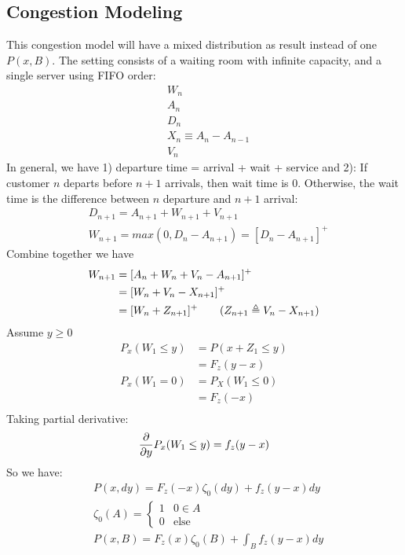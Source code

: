 \subsection{Congestion Modeling} 
This congestion model will have a mixed distribution as result instead of one $P(x,B)$. The setting consists of a waiting room with infinite capacity, and a single server using FIFO order: 
    \begin{align*}
        & W_n \tag{Waiting time for customer $n$} \\
        & A_n \tag{Arrival time for customer $n$} \\
        & D_n \tag{Departure time for customer $n$} \\
        & X_n \equiv A_n - A_{n-1} \tag{iid Inter arrival time between customer $n$ and $n-1$} \\
        & V_n \tag{iid service time for customer $n$} 
    \end{align*}
In general, we have 1) departure time = arrival + wait + service and 2): If customer $n$ departs before $n+1$ arrivals, then wait time is 0. Otherwise, the wait time is the difference between $n$ departure and $n+1$ arrival:   
    \begin{align*}
        & D_{n+1} = A_{n+1} + W_{n+1} + V_{n+1} \\
        & W_{n+1} = max(0, D_n - A_{n+1}) = [D_n - A_{n+1}]^+
    \end{align*}
Combine together we have 
    \begin{align*}
        W_{n+1} 
        & = [A_n + W_n + V_n - A_{n+1}]^+ \\
        & = [W_n + V_n - X_{n+1}]^+ \\
        & =  [W_n + Z_{n+1}]^+  \tag{$ Z_{n+1} \triangleq V_n - X_{n+1}$} 
    \end{align*}
Assume $y \geq 0$
    \begin{align*}
        P_x(W_1 \leq y) 
        & = P(x + Z_1 \leq y)  \\
        & = F_z(y-x)  \\
        P_x(W_1 = 0) 
        & = P_X(W_1 \leq 0) \\
        & = F_z(-x)\\
    \end{align*}
Taking partial derivative: 
    \begin{align*}
        \frac{\partial}{\partial y} P_x(W_1 \leq y) = f_z(y-x)
    \end{align*}
So we have: 
    \begin{align*}
        & P(x, dy) =F_z(-x) \zeta_0(dy) + f_z(y-x)dy\\
        & \zeta_0(A) = \begin{cases} 1 & 0\in A \\ 0&  \text{else} \end{cases}\\
        & P(x, B) = F_z(x) \zeta_0(B) + \int_B f_z(y-x) dy
    \end{align*}
    

